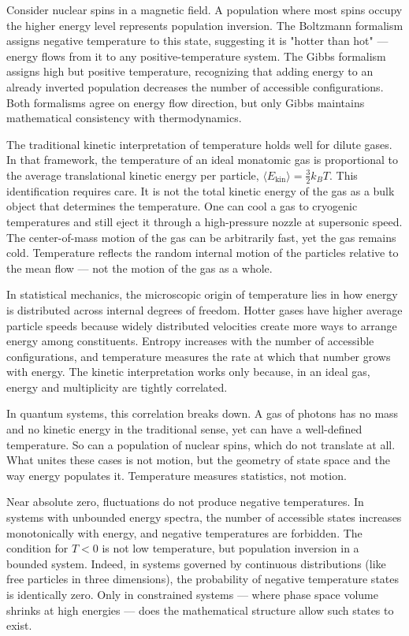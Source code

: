 Consider nuclear spins in a magnetic field. A population where most spins occupy the higher energy level represents population inversion. The Boltzmann formalism assigns negative temperature to this state, suggesting it is "hotter than hot" — energy flows from it to any positive-temperature system. The Gibbs formalism assigns high but positive temperature, recognizing that adding energy to an already inverted population decreases the number of accessible configurations. Both formalisms agree on energy flow direction, but only Gibbs maintains mathematical consistency with thermodynamics.

The traditional kinetic interpretation of temperature holds well for dilute gases. In that framework, the temperature of an ideal monatomic gas is proportional to the average translational kinetic energy per particle, $ \langle E_\text{kin} \rangle = \frac{3}{2}k_B T $. This identification requires care. It is not the total kinetic energy of the gas as a bulk object that determines the temperature. One can cool a gas to cryogenic temperatures and still eject it through a high-pressure nozzle at supersonic speed. The center-of-mass motion of the gas can be arbitrarily fast, yet the gas remains cold. Temperature reflects the random internal motion of the particles relative to the mean flow — not the motion of the gas as a whole.

In statistical mechanics, the microscopic origin of temperature lies in how energy is distributed across internal degrees of freedom. Hotter gases have higher average particle speeds because widely distributed velocities create more ways to arrange energy among constituents. Entropy increases with the number of accessible configurations, and temperature measures the rate at which that number grows with energy. The kinetic interpretation works only because, in an ideal gas, energy and multiplicity are tightly correlated.

In quantum systems, this correlation breaks down. A gas of photons has no mass and no kinetic energy in the traditional sense, yet can have a well-defined temperature. So can a population of nuclear spins, which do not translate at all. What unites these cases is not motion, but the geometry of state space and the way energy populates it. Temperature measures statistics, not motion.

Near absolute zero, fluctuations do not produce negative temperatures. In systems with unbounded energy spectra, the number of accessible states increases monotonically with energy, and negative temperatures are forbidden. The condition for $ T < 0 $ is not low temperature, but population inversion in a bounded system. Indeed, in systems governed by continuous distributions (like free particles in three dimensions), the probability of negative temperature states is identically zero. Only in constrained systems — where phase space volume shrinks at high energies — does the mathematical structure allow such states to exist.

